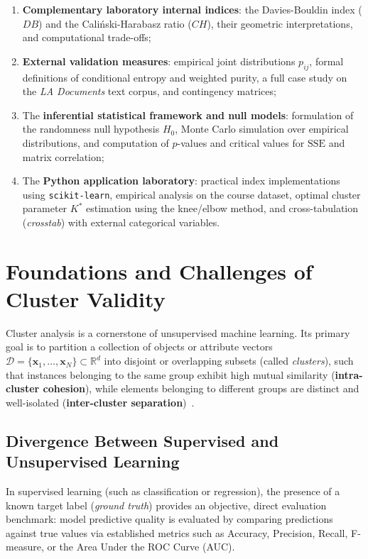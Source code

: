 \begin{enumerate}[noitemsep]
    \item \textbf{Complementary laboratory internal indices}: the Davies-Bouldin index ($DB$) and the Cali\'nski-Harabasz ratio ($CH$), their geometric interpretations, and computational trade-offs;
    \item \textbf{External validation measures}: empirical joint distributions $p_{ij}$, formal definitions of conditional entropy and weighted purity, a full case study on the \textit{LA Documents} text corpus, and contingency matrices;
    \item The \textbf{inferential statistical framework and null models}: formulation of the randomness null hypothesis $H_0$, Monte Carlo simulation over empirical distributions, and computation of $p$-values and critical values for $\mathrm{SSE}$ and matrix correlation;
    \item The \textbf{Python application laboratory}: practical index implementations using \texttt{scikit-learn}, empirical analysis on the course dataset, optimal cluster parameter $K^*$ estimation using the knee/elbow method, and cross-tabulation (\textit{crosstab}) with external categorical variables.
\end{enumerate}

\section{Foundations and Challenges of Cluster Validity}
\label{sec:dm-validity-foundations}

Cluster analysis is a cornerstone of unsupervised machine learning. Its primary goal is to partition a collection of objects or attribute vectors $\mathcal{D} = \{\mathbf{x}_1, \dots, \mathbf{x}_N\} \subset \mathbb{R}^d$ into disjoint or overlapping subsets (called \textit{clusters}), such that instances belonging to the same group exhibit high mutual similarity (\textbf{intra-cluster cohesion}), while elements belonging to different groups are distinct and well-isolated (\textbf{inter-cluster separation})~\cite{tan2018}.

\subsection{Divergence Between Supervised and Unsupervised Learning}
In supervised learning (such as classification or regression), the presence of a known target label (\textit{ground truth}) provides an objective, direct evaluation benchmark: model predictive quality is evaluated by comparing predictions against true values via established metrics such as Accuracy, Precision, Recall, F-measure, or the Area Under the ROC Curve (AUC).

